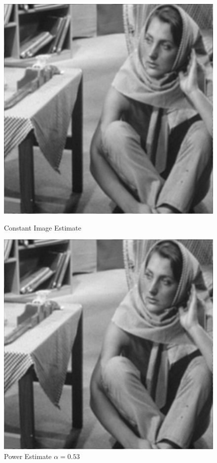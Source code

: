 \documentclass{article}
\begin{document}
    \phantom{}
    
    \begin{figure}[!htb]
      \includegraphics[scale=.45]{./deblurring/estimate/constant.png}
      \caption{Constant Image Estimate}
    \endminipage \hfill
      \includegraphics[scale=.45]{./deblurring/estimate/power.png}
      \caption{Power Estimate \(\alpha = 0.53\)}
    \endminipage
    \end{figure}
\end{document}
